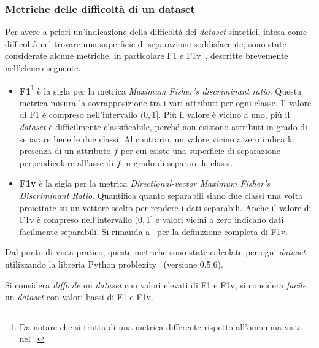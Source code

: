 \subsubsection{Metriche delle difficoltà di un dataset}\label{sec:metriche_dataset}
Per avere a priori un'indicazione della difficoltà dei \emph{dataset} sintetici, intesa come difficoltà nel trovare una superficie di separazione soddisfacente, sono state considerate alcune metriche, in particolare F1 e F1v~\cite{ds_complexity}, descritte brevemente nell'elenco seguente.
\begin{itemize}
    \item \textbf{F1}\footnote{Da notare che si tratta di una metrica differente rispetto all'omonima vista nel~.} è la sigla per la metrica \emph{Maximum Fisher’s discriminant ratio}. Questa metrica misura la sovrapposizione tra i vari attributi per ogni classe.
    Il valore di F1 è compreso nell'intervallo $(0,1]$. Più il valore è vicino a uno, più il \emph{dataset} è difficilmente classificabile, perché non esistono attributi in grado di separare bene le due classi. Al contrario, un valore vicino a zero indica la presenza di un attributo $f$ per cui esiste una superficie di separazione perpendicolare all'asse di $f$ in grado di separare le classi.
    \item \textbf{F1v} è la sigla per la metrica \emph{Directional-vector Maximum Fisher’s Discriminant Ratio}. Quantifica quanto separabili siano due classi una volta proiettate su un vettore scelto per rendere i dati separabili.
    Anche il valore di F1v è compreso nell'intervallo $(0,1]$ e valori vicini a zero indicano dati facilmente separabili.    
    Si rimanda a~\cite{ds_complexity} per la definizione completa di F1v.
\end{itemize}

Dal punto di vista pratico, queste metriche sono state calcolate per ogni \emph{dataset} utilizzando la libreria Python problexity~\cite{problexity} (versione 0.5.6).

Si considera \emph{difficile} un \emph{dataset} con valori elevati di F1 e F1v; si considera \emph{facile} un \emph{dataset} con valori bassi di F1 e F1v.


